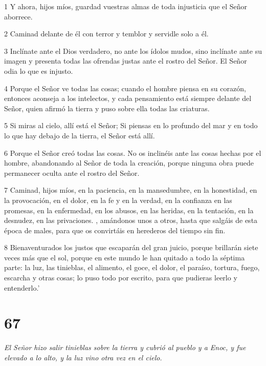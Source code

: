 \par 1 Y ahora, hijos míos, guardad vuestras almas de toda injusticia que el Señor aborrece.

\par 2 Caminad delante de él con terror y temblor y servidle solo a él.

\par 3 Inclínate ante el Dios verdadero, no ante los ídolos mudos, sino inclínate ante su imagen y presenta todas las ofrendas justas ante el rostro del Señor. El Señor odia lo que es injusto.

\par 4 Porque el Señor ve todas las cosas; cuando el hombre piensa en su corazón, entonces aconseja a los intelectos, y cada pensamiento está siempre delante del Señor, quien afirmó la tierra y puso sobre ella todas las criaturas.

\par 5 Si miras al cielo, allí está el Señor; Si piensas en lo profundo del mar y en todo lo que hay debajo de la tierra, el Señor está allí.

\par 6 Porque el Señor creó todas las cosas. No os inclinéis ante las cosas hechas por el hombre, abandonando al Señor de toda la creación, porque ninguna obra puede permanecer oculta ante el rostro del Señor.

\par 7 Caminad, hijos míos, en la paciencia, en la mansedumbre, en la honestidad, en la provocación, en el dolor, en la fe y en la verdad, en la confianza en las promesas, en la enfermedad, en los abusos, en las heridas, en la tentación, en la desnudez, en las privaciones. , amándonos unos a otros, hasta que salgáis de esta época de males, para que os convirtáis en herederos del tiempo sin fin.

\par 8 Bienaventurados los justos que escaparán del gran juicio, porque brillarán siete veces más que el sol, porque en este mundo le han quitado a todo la séptima parte: la luz, las tinieblas, el alimento, el goce, el dolor, el paraíso, tortura, fuego, escarcha y otras cosas; lo puso todo por escrito, para que pudieras leerlo y entenderlo.'

\chapter{67}

\par \textit{El Señor hizo salir tinieblas sobre la tierra y cubrió al pueblo y a Enoc, y fue elevado a lo alto, y la luz vino otra vez en el cielo.}

